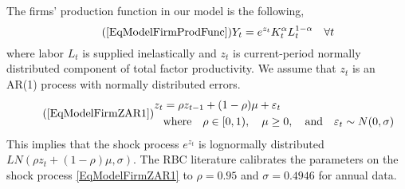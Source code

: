 \documentclass[letterpaper,12pt]{article}
\theoremstyle{definition}
\newcommand\ve{\varepsilon}
\begin{document}
  The firms' production function in our model is the following,
  \begin{equation}\tag{\ref{EqModelFirmProdFunc}}
    Y_t = e^{z_t}K_t^\alpha L_t^{1-\alpha} \quad\forall t
  \end{equation}
  where labor $L_t$ is supplied inelastically and $z_t$ is current-period normally distributed component of total factor productivity. We assume that $z_t$ is an AR(1) process with normally distributed errors.
  \begin{equation}\tag{\ref{EqModelFirmZAR1}}
    \begin{split}
      z_t &= \rho z_{t-1} + (1-\rho)\mu + \ve_t \\
      &\text{where}\quad \rho\in[0,1), \quad\mu\geq 0, \quad\text{and}\quad \ve_t \sim N(0,\sigma)
    \end{split}
  \end{equation}
  This implies that the shock process $e^{z_t}$ is lognormally distributed $LN(\rho z_t + (1-\rho)\mu,\sigma)$. The RBC literature calibrates the parameters on the shock process \eqref{EqModelFirmZAR1} to $\rho=0.95$ and $\sigma = 0.4946$ for annual data.
\end{document}

